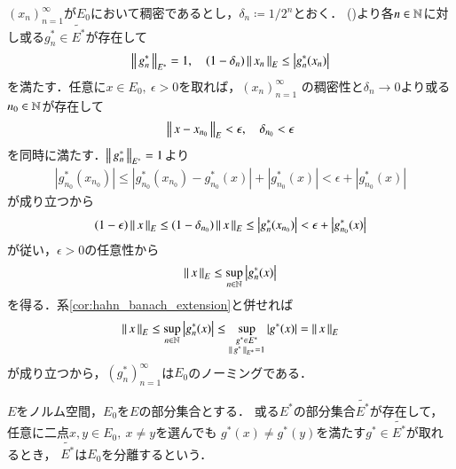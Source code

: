 	\begin{prf}
		$(x_n)_{n=1}^{\infty}$が$E_0$において稠密であるとし，$\delta_n \coloneqq 1/2^n$とおく．
		()より各$n \in \mathbb{N}$に対し或る$g^*_n \in \tilde{E^*}$が存在して
		\begin{align}
			\left\|\, g^*_n\, \right\|_{E^*} = 1,
			\quad (1 - \delta_n) \left\|\, x_n\, \right\|_{E} \leq \left| g^*_n(x_n) \right|
		\end{align}
		を満たす．任意に$x \in E_0,\ \epsilon > 0$を取れば，$(x_n)_{n=1}^{\infty}$
		の稠密性と$\delta_n \longrightarrow 0$より或る$n_0 \in \mathbb{N}$が存在して
		\begin{align}
			\left\|\, x - x_{n_0}\, \right\|_{E} < \epsilon,
			\quad \delta_{n_0} < \epsilon
		\end{align}
		を同時に満たす．$\left\|\, g^*_n\, \right\|_{E^*} = 1$より
		\begin{align}
			\left| g^*_{n_0}(x_{n_0}) \right| \leq \left| g^*_{n_0}(x_{n_0}) - g^*_{n_0}(x) \right| + \left| g^*_{n_0}(x) \right|
			< \epsilon + \left| g^*_{n_0}(x) \right|
		\end{align}
		が成り立つから
		\begin{align}
			(1 - \epsilon) \left\|\, x\, \right\|_{E}
			\leq (1 - \delta_{n_0}) \left\|\, x\, \right\|_{E}
			\leq \left| g^*_n(x_{n_0}) \right|
			< \epsilon + \left| g^*_{n_0}(x) \right|
		\end{align}
		が従い，$\epsilon > 0$の任意性から
		\begin{align}
			\left\|\, x\, \right\|_{E} \leq \operatorname*{sup}_{n \in \mathbb{N}} \left| g^*_n(x) \right|
		\end{align}
		を得る．系\ref{cor:hahn_banach_extension}と併せれば
		\begin{align}
			\left\|\, x\, \right\|_{E} \leq \operatorname*{sup}_{n \in \mathbb{N}} \left| g^*_n(x) \right|
			\leq \operatorname*{sup}_{\substack{g^* \in E^* \\ \left\|\, g^*\, \right\|_{E^*} = 1}} \left| g^*(x) \right|
			= \left\|\, x\, \right\|_{E}
		\end{align}
		が成り立つから，$\left( g^*_n \right)_{n=1}^{\infty}$は$E_0$のノーミングである．
		\QED
	\end{prf}
	
	\begin{screen}
		\begin{dfn}[分離]
			$E$をノルム空間，$E_0$を$E$の部分集合とする．
			或る$E^*$の部分集合$\tilde{E^*}$が存在して，
			任意に二点$x,y \in E_0,\ x \neq y$を選んでも
			$g^*(x) \neq g^*(y)$を満たす$g^* \in \tilde{E^*}$が取れるとき，
			$\tilde{E^*}$は$E_0$を分離するという．
		\end{dfn}
	\end{screen}
	
